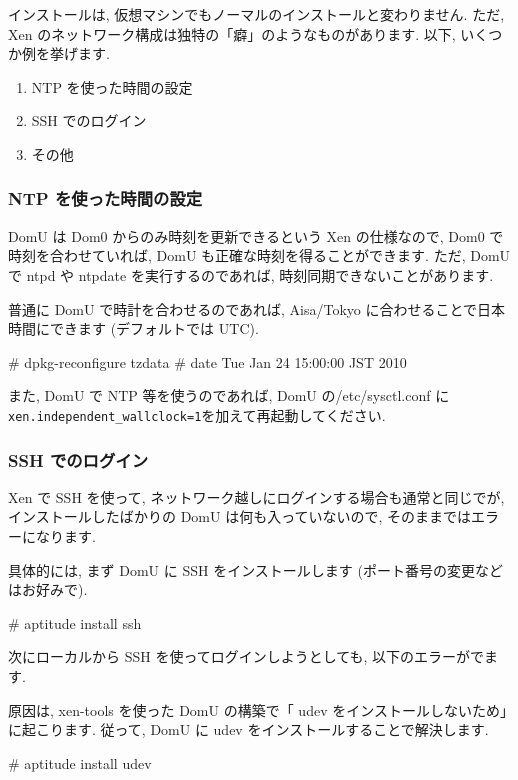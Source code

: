 \documentclass[mingoth,a4paper]{jsarticle}
\begin{document}
インストールは, 仮想マシンでもノーマルのインストールと変わりません. ただ, Xen のネットワーク構成は独特の「癖」のようなものがあります. 以下, いくつか例を挙げます.
\begin{enumerate}
\item NTP を使った時間の設定 
\item SSH でのログイン
\item その他 
\end{enumerate}

\subsubsection{NTP を使った時間の設定}
DomU は Dom0 からのみ時刻を更新できるという Xen の仕様なので, Dom0 で時刻を合わせていれば, DomU も正確な時刻を得ることができます. ただ, DomU で ntpd や ntpdate を実行するのであれば, 時刻同期できないことがあります.

普通に DomU で時計を合わせるのであれば, Aisa/Tokyo に合わせることで日本時間にできます (デフォルトでは UTC).
\begin{commandline}
# dpkg-reconfigure tzdata
# date
  Tue Jan 24 15:00:00 JST 2010
\end{commandline}

また, DomU で NTP 等を使うのであれば, DomU の/etc/sysctl.conf に{\tt xen.independent\_wallclock=1}を加えて再起動してください.

\subsubsection{SSH でのログイン}
Xen で SSH を使って, ネットワーク越しにログインする場合も通常と同じでが, インストールしたばかりの DomU は何も入っていないので, そのままではエラーになります.

具体的には, まず DomU に SSH をインストールします (ポート番号の変更などはお好みで).
\begin{commandline}
# aptitude install ssh
\end{commandline}

次にローカルから SSH を使ってログインしようとしても, 以下のエラーがでます.

原因は, xen-tools を使った DomU の構築で「 udev をインストールしないため」に起こります. 従って, DomU に udev をインストールすることで解決します.
\begin{commandline}
# aptitude install udev
\end{commandline}
\end{document}
